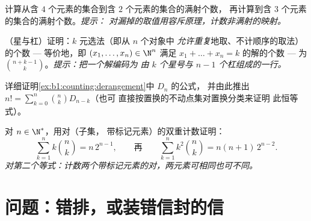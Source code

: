 \begin{exercise}[$\star\star$]\label{exo:b1:counting:9}
计算从含 $4$ 个元素的集合到含 $2$ 个元素的集合的满射个数，
再计算到含 $3$ 个元素的集合的满射个数。\emph{提示：
对漏掉的取值用容斥原理，计数非满射的映射。}
\end{exercise}

\begin{exercise}[$\star\star$]\label{exo:b1:counting:10}
（星与杠）证明：$k$ 元选法（即从 $n$ 个对象中
\emph{允许重复}地取、不计顺序的取法）的个数 --- 等价地，即
$(x_1, \dots, x_n) \in \N^n$ 满足 $x_1 + \dots + x_n = k$ 的解的个数
--- 为 $\binom{n + k - 1}{k}$。\emph{提示：把一个解编码为
由 $k$ 个星号与 $n - 1$ 个杠组成的一行。}
\end{exercise}

\begin{exercise}[$\star\star\star$]\label{exo:b1:counting:11}
详细证明\cref{ex:b1:counting:derangement}中 $D_n$ 的公式，
并由此推出 $n! = \sum_{k=0}^{n} \binom{n}{k} D_{n-k}$（也可
直接按置换的不动点集对置换分类来证明
此恒等式）。
\end{exercise}

\begin{exercise}[$\star\star\star$]\label{exo:b1:counting:12}
对 $n \in \N^*$，用对（子集，
带标记元素）的双重计数证明：
\[
\sum_{k=1}^{n} k \binom{n}{k} = n\, 2^{n-1},
\qquad\text{再}\qquad
\sum_{k=1}^{n} k^2 \binom{n}{k} = n(n+1)\, 2^{n-2} .
\]
\emph{对第二个等式：计数两个带标记元素的对，两元素可相同也可不同。}
\end{exercise}

\section{问题：错排，或装错信封的信}


